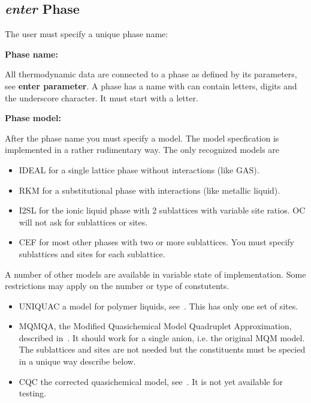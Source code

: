 \documentclass[11pt]{article}
\begin{document}
\hypertarget{Enter phase}{}
\hypertarget{enter phase name}{}
\subsection{{\em enter} Phase}

The user must specify a unique phase name:

{\bf Phase name:}

All thermodynamic data are connected to a phase as defined by its
parameters, see {\bf enter parameter}.  A phase has a name with can
contain letters, digits and the underscore character.  It must start
with a letter.

\hypertarget{Enter phase model}{{\bf Phase model:}}

After the phase name you must specify a model.  The model specfication
is implemented in a rather rudimentary way. The only recognized models
are

\begin{itemize}
\item IDEAL for a single lattice phase without interactions (like GAS).
\item RKM for a substitutional phase with interactions (like metallic
  liquid).
\item I2SL for the ionic liquid phase with 2 sublattices with variable
  site ratios.  OC will not ask for sublattices or sites.
\item CEF for most other phases with two or more sublattices.  You must
  specify sublattices and sites for each sublattice.
\end{itemize}

A number of other models are available in variable state of
implementation.  Some restrictions may apply on the number or type of
constutents.
\begin{itemize}
\item UNIQUAC a model for polymer liquids, see~\cite{20Li}.  This has
  only one set of sites.
\item MQMQA, the Modified Quasichemical Model Quadruplet
  Approximation, described in~\cite{01Pel}.  It should work for a
  single anion, i.e. the original MQM model.  The sublattices and
  sites are not needed but the constituents must be specied in a
  unique way describe below.
\item CQC the corrected quasichemical model, see~\cite{09Hil}.  It is
  not yet available for testing.
\end{itemize}
\end{document}
